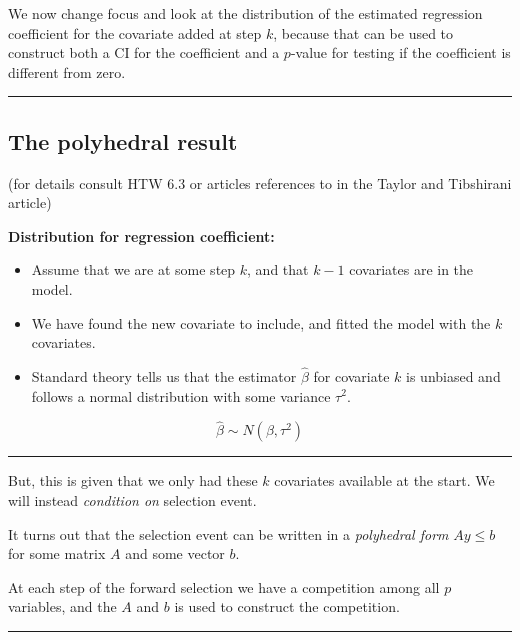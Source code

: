 \documentclass[
  letterpaper,
  DIV=11,
  numbers=noendperiod]{scrartcl}
\providecommand{\tightlist}{%
  \setlength{\itemsep}{0pt}\setlength{\parskip}{0pt}}\usepackage{longtable,booktabs,array}
\begin{document}
We now change focus and look at the distribution of the estimated
regression coefficient for the covariate added at step \(k\), because
that can be used to construct both a CI for the coefficient and a
\(p\)-value for testing if the coefficient is different from zero.

\begin{center}\rule{0.5\linewidth}{0.5pt}\end{center}

\hypertarget{the-polyhedral-result}{%
\subsection{The polyhedral result}\label{the-polyhedral-result}}

(for details consult HTW 6.3 or articles references to in the Taylor and
Tibshirani article)

\textbf{Distribution for regression coefficient:}

\begin{itemize}
\tightlist
\item
  Assume that we are at some step \(k\), and that \(k-1\) covariates are
  in the model.
\item
  We have found the new covariate to include, and fitted the model with
  the \(k\) covariates.
\item
  Standard theory tells us that the estimator \(\hat{\beta}\) for
  covariate \(k\) is unbiased and follows a normal distribution with
  some variance \(\tau^2\).
\end{itemize}

\[ \hat{\beta} \sim N(\beta,\tau^2)\]

\begin{center}\rule{0.5\linewidth}{0.5pt}\end{center}

But, this is given that we only had these \(k\) covariates available at
the start. We will instead \emph{condition on} selection event.

It turns out that the selection event can be written in a
\emph{polyhedral form} \(A y \le b\) for some matrix \(A\) and some
vector \(b\).

At each step of the forward selection we have a competition among all
\(p\) variables, and the \(A\) and \(b\) is used to construct the
competition.

\begin{center}\rule{0.5\linewidth}{0.5pt}\end{center}
\end{document}
